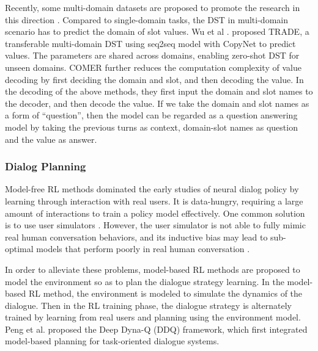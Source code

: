 \documentclass[10pt,twocolumn,letterpaper]{article}
\begin{document}
Recently, some multi-domain datasets are proposed to promote the research in this direction \cite{budzianowski2018multiwoz,rastogi2020towards}. Compared to single-domain tasks, the DST in multi-domain scenario has to predict the domain of slot values. Wu et al . proposed TRADE\cite{rastogi2020towards}, a transferable multi-domain DST using seq2seq model with CopyNet \cite{gu2016incorporating} to predict values. The parameters are shared across domains, enabling zero-shot DST for unseen domains. COMER \cite{ren2020scalable} further reduces the computation complexity of value decoding by first deciding the domain and slot, and then decoding the value. In the decoding of the above methods, they first input the domain and slot names to the decoder, and then decode the value. If we take the domain and slot names as a form of “question”, then the model can be regarded as a question answering model by taking the previous turns as context, domain-slot names as question and the value as answer.

\subsubsection{Dialog Planning}
Model-free RL methods dominated the early studies of neural dialog policy by learning through interaction with real users\cite{mnih2015human,williams2017hybrid,dhingra2016towards}. It is data-hungry, requiring a large amount of interactions to train a policy model effectively. One common solution is to use user simulators \cite{schatzmann2007agenda,li2016user}. However, the user simulator is not able to fully mimic real human conversation behaviors, and its inductive bias may lead to sub-optimal models that perform poorly in real human conversation \cite{shi2019build} .

In order to alleviate these problems, model-based RL methods are proposed to model the environment so as to plan the dialogue strategy learning. In the model-based RL method, the environment is modeled to simulate the dynamics of the dialogue. Then in the RL training phase, the dialogue strategy is alternately trained by learning from real users and planning using the environment model. Peng et al.\cite{peng2018deep} proposed the Deep Dyna-Q (DDQ) framework, which first integrated model-based planning for task-oriented dialogue systems.
\end{document}
